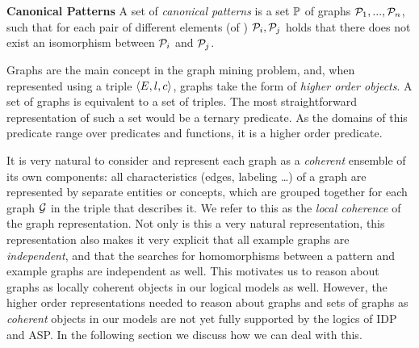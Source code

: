 \begin{definition} \textbf{Canonical Patterns}
A set of \emph{canonical patterns} is a set $\mathbb{P}$ of graphs $\mathcal{P}_{1},...,\mathcal{P}_{n}$, such that for each pair of different elements (of ) $\mathcal{P}_{i}, \mathcal{P}_{j}$ holds that there does not exist an isomorphism between $\mathcal{P}_{i}$ and $\mathcal{P}_{j}$.
\end{definition}

Graphs are the main concept in the graph mining problem, and, when represented using a triple $\langle E,l,c \rangle$, graphs take the form of \emph{higher order objects}.
A set of graphs
is equivalent to a set of triples.
The most straightforward representation of such a set would 
be a ternary predicate.
As the domains of this predicate range over predicates and functions, it is a higher order predicate.

It is very natural to consider and represent each graph as a \emph{coherent} ensemble of its own components: all characteristics (edges, labeling \ldots) of a graph are represented by separate entities or concepts, which are grouped together for each graph $\mathcal{G}$ in the triple that describes it. We refer to this as the \emph{local coherence} of the graph representation.
Not only is this a very natural representation, this representation also makes it very explicit that all example graphs are \emph{independent}, and that the searches for homomorphisms between a pattern and example graphs are independent as well.
This motivates us to reason about graphs as locally coherent objects in our logical models as well.
However, the higher order representations needed to reason about graphs and sets of graphs as \emph{coherent} objects in our models are not yet fully supported by the logics of IDP and ASP.
In the following section we discuss how we can deal with this.


